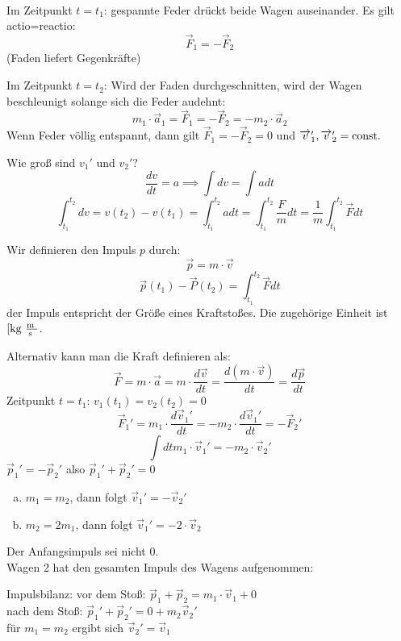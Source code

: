 \documentclass[a4paper,10pt]{scrartcl}
\begin{document}
\\
\begin{seg}{Im Zeitpunkt $\boxed{t=t_1}$:}
  gespannte Feder drückt beide Wagen auseinander. Es gilt actio=reactio:
\[
 \vec F_1=-\vec F_2
\]
(Faden liefert Gegenkräfte)
\end{seg}
\begin{seg}{Im Zeitpunkt $\boxed{t=t_2}$:}
 Wird der Faden durchgeschnitten, wird der Wagen beschleunigt solange sich die Feder audehnt:
\[
 m_1\cdot \vec a_1=\vec F_1=-\vec F_2=-m_2\cdot \vec a_2
\]
Wenn Feder völlig entspannt, dann gilt $\vec F_1=-\vec F_2=0$ und $\overrightarrow{v}_1', \overrightarrow{v}_2'=\text{const}.$
\end{seg}
\begin{seg}{Wie groß sind $v_1'$ und $v_2'$?}
\[
 \frac{dv}{dt}=a \implies \int dv=\int a dt
\]
\[
 \int_{t_1}^{t_2}dv=v(t_2)-v(t_1)=\int_{t_1}^{t_2} a dt =\int_{t_1}^{t_2} \frac{F}{m} dt=\frac{1}{m} \int_{t_1}^{t_2} \vec F dt
\]
\begin{df}[Impuls]
 Wir definieren den Impuls $p$ durch:
\[
 \vec p =m\cdot \vec v 
\]
\[
 \vec p(t_1)-\vec P(t_2)=\int_{t_1}^{t_2} \vec F dt
\]
der Impuls entspricht der Größe eines Kraftstoßes.  Die zugehörige Einheit ist $[\text{kg } \frac{\text{m }}{\text{s }}$.
\end{df} 
Alternativ kann man die Kraft definieren als:
\[
 \vec F=m\cdot \vec a=m\cdot \frac{d\vec v}{dt}=\frac{d(m\cdot \vec v)}{dt}=\frac{d\vec p}{dt}
\]
Zeitpunkt $t=t_1$: $v_1(t_1)=v_2(t_2)=0$\\
\[
 \vec F_1'=m_1\cdot \frac{d\vec v_1'}{dt}=-m_2\cdot \frac{d\vec v_1'}{dt}=-\vec F_2'
\]
\[
 \int dt m_1\cdot \vec v_1'=-m_2\cdot \vec v_2'
\]
$\vec p_1'=-\vec p_2'$ also $\boxed{\vec p_1'+\vec p_2'=0}$
\begin{enumerate}[a)]
 \item $m_1=m_2$, dann folgt $\vec v_1'=-\vec v_2'$
 \item $m_2=2m_1$, dann folgt $\vec v_1'=-2\cdot \vec v_2$
\end{enumerate}
Der Anfangsimpuls sei nicht $0$. \\
Wagen 2 hat den gesamten Impuls des Wagens aufgenommen:
\end{seg}
\begin{seg}{Impulsbilanz:}
vor dem Stoß: $\vec p_1+\vec p_2=m_1\cdot \vec v_1+0$\\
nach dem Stoß: $\vec p_1'+ \vec p_2'=0+m_2\vec v_2'$\\
für $m_1=m_2$ ergibt sich $\vec v_2'=\vec v_1$
\end{seg}
\end{document}
